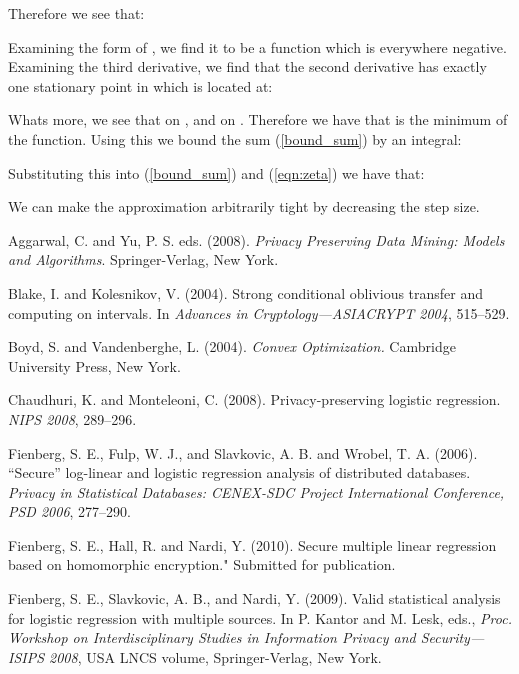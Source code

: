 \documentclass[11pt]{article}
\begin{document}
Therefore we see that:


Examining the form of , we find it to be a function which is everywhere negative.  Examining the third derivative, we find that the second derivative has exactly one stationary point in  which is located at:



Whats more, we see that  on , and  on .  Therefore we have that  is the minimum of the function.  Using this we  bound the sum (\ref{bound_sum}) by an integral:


Substituting this into (\ref{bound_sum}) and (\ref{eqn:zeta}) we have that:

We can make  the approximation arbitrarily tight by decreasing the step size.




\newpage
\begin{thebibliography}{99}

 

 Aggarwal, C.  and  Yu, P. S. eds. (2008). \textit{Privacy Preserving Data Mining: Models and Algorithms}.   Springer-Verlag, New York.

 Blake, I. and Kolesnikov, V. (2004). Strong conditional oblivious transfer and computing on intervals. In \textit{Advances in Cryptology---ASIACRYPT 2004}, 515--529.

 Boyd, S. and Vandenberghe, L. (2004).  \textit{Convex Optimization.}  Cambridge University Press, New York.

 Chaudhuri, K. and  Monteleoni, C. (2008).  Privacy-preserving logistic regression. \textit{NIPS 2008},  289--296.

Fienberg, S. E.,  Fulp, W. J., and Slavkovic, A. B. and Wrobel, T. A. (2006).  ``{S}ecure'' log-linear and logistic regression analysis of distributed databases. \textit{Privacy in Statistical Databases: CENEX-SDC Project International Conference, PSD 2006}, 277--290.

 Fienberg, S. E., Hall, R. and Nardi, Y. (2010).  Secure multiple linear regression based on homomorphic encryption."  Submitted for publication.

Fienberg, S. E., Slavkovic, A. B., and  Nardi, Y. (2009).  Valid statistical analysis for logistic regression with multiple sources. In P. Kantor and M. Lesk, eds.,  \textit{Proc. Workshop on Interdisciplinary Studies in Information Privacy and Security---ISIPS 2008}, USA  LNCS volume, Springer-Verlag, New York.



\end{thebibliography}
\end{document}
